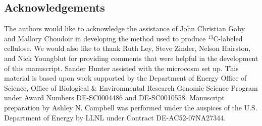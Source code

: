 \subsection{Acknowledgements} The authors would like to acknowledge the
assistance of John Christian Gaby and Mallory Choudoir in developing the method
used to produce $^{13}$C-labeled cellulose. We would also like to thank
Ruth Ley, Steve Zinder, Nelson Hairston, and Nick Youngblut for providing comments that
were helpful in the development of this manuscript. Sander Hunter assisted with
the microcosm set up. This material is based upon
work supported by the Department of Energy Office of Science, Office of
Biological \& Environmental Research Genomic Science Program under Award Numbers
DE-SC0004486 and DE-SC0010558. Manuscript preparation by Ashley N. Campbell was
performed under the auspices of the U.S. Department of Energy by LLNL under
Contract DE-AC52-07NA27344.

